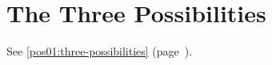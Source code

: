 
\chapter{The Three Possibilities}
\label{app:three-possibilities}

See \cref{pos01:three-possibilities} (page~\pageref{pos01:three-possibilities}).
